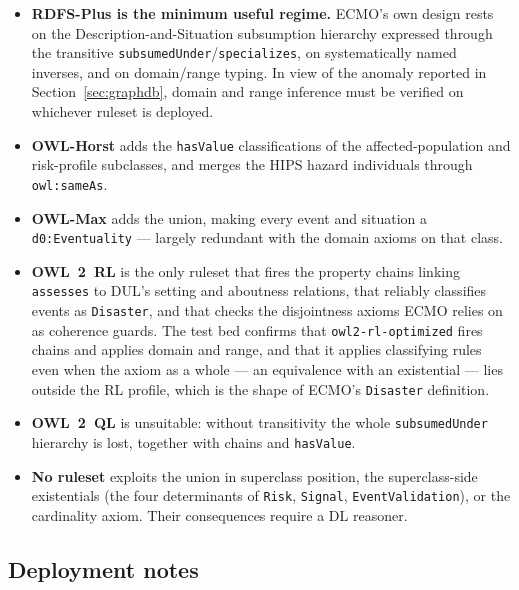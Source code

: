 \documentclass[11pt,a4paper]{article}
\begin{document}
\begin{itemize}
  \item \textbf{RDFS-Plus is the minimum useful regime.} ECMO's own design
    rests on the Description-and-Situation subsumption hierarchy expressed
    through the transitive \texttt{subsumedUnder}/\texttt{specializes}, on
    systematically named inverses, and on domain/range typing. In view of the
    anomaly reported in Section~\ref{sec:graphdb}, domain and range inference
    must be verified on whichever ruleset is deployed.
  \item \textbf{OWL-Horst} adds the \texttt{hasValue} classifications of the
    affected-population and risk-profile subclasses, and merges the HIPS
    hazard individuals through \texttt{owl:sameAs}.
  \item \textbf{OWL-Max} adds the union, making every event and situation a
    \texttt{d0:Eventuality} --- largely redundant with the domain axioms on
    that class.
  \item \textbf{OWL~2~RL} is the only ruleset that fires the property chains
    linking \texttt{assesses} to DUL's setting and aboutness relations, that
    reliably classifies events as \texttt{Disaster}, and that checks the
    disjointness axioms ECMO relies on as coherence guards. The test bed
    confirms that \texttt{owl2-rl-optimized} fires chains and applies domain
    and range, and that it applies classifying rules even when the axiom as a
    whole --- an equivalence with an existential --- lies outside the RL
    profile, which is the shape of ECMO's \texttt{Disaster} definition.
  \item \textbf{OWL~2~QL} is unsuitable: without transitivity the whole
    \texttt{subsumedUnder} hierarchy is lost, together with chains and
    \texttt{hasValue}.
  \item \textbf{No ruleset} exploits the union in superclass position, the
    superclass-side existentials (the four determinants of \texttt{Risk},
    \texttt{Signal}, \texttt{EventValidation}), or the cardinality axiom.
    Their consequences require a DL reasoner.
\end{itemize}

\subsection*{Deployment notes}
\end{document}
